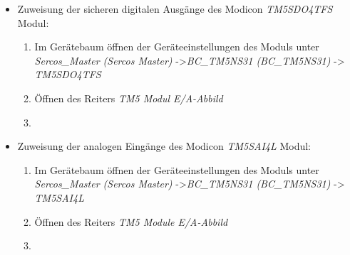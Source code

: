 \documentclass[../../../Bachelorarbeit.tex]{subfiles}
\begin{document}
\begin{itemize}
\begin{enumerate}
\begin{minipage}[t]{\linewidth}
{            }
            \label{fig:my-img28}
        \end{minipage}
    \end{enumerate}
    \item Zuweisung der sicheren digitalen Ausgänge des Modicon \textit{TM5SDO4TFS} Modul:
    \begin{enumerate}
        \item Im Gerätebaum öffnen der Geräteeinstellungen des Moduls unter \textit{Sercos\_Master (Sercos Master)} ->\small \textit{BC\_TM5NS31 (BC\_TM5NS31)} -> \textit{TM5SDO4TFS}
        \item \normalsize Öffnen des Reiters \textit{TM5 Modul E/A-Abbild}
        \item \begin{minipage}[t]{\linewidth}
            \raggedright
            \label{fig:my-img29}
        \end{minipage}
    \end{enumerate}
    \item Zuweisung der analogen Eingänge des Modicon \textit{TM5SAI4L} Modul:
    \begin{enumerate}
        \item Im Gerätebaum öffnen der Geräteeinstellungen des Moduls unter \textit{Sercos\_Master (Sercos Master)} ->\small \textit{BC\_TM5NS31 (BC\_TM5NS31)} -> \textit{TM5SAI4L}
        \item \normalsize Öffnen des Reiters \textit{TM5 Module E/A-Abbild}
        \item \begin{minipage}[t]{\linewidth}
            \raggedright
\end{minipage}
\end{enumerate}
\end{itemize}
\end{document}
